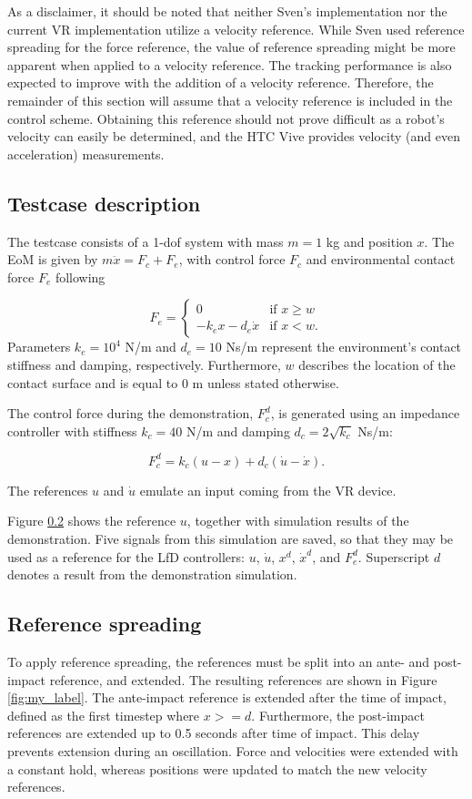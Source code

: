 \documentclass[11pt]{report}
\numberwithin{equation}{section}        %
\numberwithin{figure}{section}          %
\numberwithin{table}{section}           %
\begin{document}
  As a disclaimer, it should be noted that neither Sven's implementation nor the current VR implementation utilize a velocity reference. While Sven used reference spreading for the force reference, the value of reference spreading might be more apparent when applied to a velocity reference. The tracking performance is also expected to improve with the addition of a velocity reference. Therefore, the remainder of this section will assume that a velocity reference is included in the control scheme. Obtaining this reference should not prove difficult as a robot's velocity can easily be determined, and the HTC Vive provides velocity (and even acceleration) measurements.

  \subsection{Testcase description}
  The testcase consists of a 1-dof system with mass $m=1$ kg and position $x$. The EoM is given by $m\ddot{x}=F_c+F_e$, with control force $F_c$ and environmental contact force $F_e$ following

  $$F_e=\begin{cases}
    0 & \text{if } x\geq w\\
    -k_e x-d_e \dot{x}               & \text{if } x<w.
  \end{cases}$$
  Parameters $k_e=10^4$ N/m and $d_e=10$ Ns/m represent the environment's contact stiffness and damping, respectively. Furthermore, $w$ describes the location of the contact surface and is equal to $0$ m unless stated otherwise.

  The control force during the demonstration, $F_c^d$, is generated using an impedance controller with stiffness $k_c=40$ N/m and damping $d_c=2\sqrt{k_c}$ Ns/m:

  $$ F_c^d = k_c(u-x)+d_c(\dot{u}-\dot{x}).$$

  The references $u$ and $\dot{u}$ emulate an input coming from the VR device.

  Figure \ref{} shows the reference $u$, together with simulation results of the demonstration. Five signals from this simulation are saved, so that they may be used as a reference for the LfD controllers: $u$, $\dot{u}$, $x^d$, $\dot{x}^d$, and $F_e^d$. Superscript $d$ denotes a result from the demonstration simulation.

  \subsection{Reference spreading}
  To apply reference spreading, the references must be split into an ante- and post-impact reference, and extended. The resulting references are shown in Figure \ref{fig:my_label}. The ante-impact reference is extended after the time of impact, defined as the first timestep where $x>=d$. Furthermore, the post-impact references are extended up to 0.5 seconds after time of impact. This delay prevents extension during an oscillation. Force and velocities were extended with a constant hold, whereas positions were updated to match the new velocity references.
\end{document}
